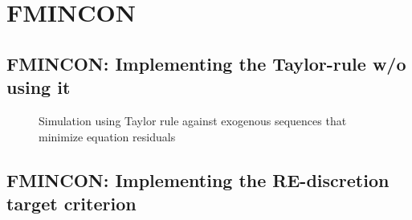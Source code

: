 \documentclass[11pt]{article}
\def \myFigPath {../figures/}
\renewcommand{\[}{\begin{equation}}
\renewcommand{\]}{\end{equation}}
\def\myAdjustableFigScale{0.16}
\begin{document}
\section{FMINCON}
\subsection{FMINCON: Implementing the Taylor-rule w/o using it}

\vspace{-0.2cm}

\begin{figure}[h!]
\hfill
{}
\caption{Simulation using Taylor rule against exogenous sequences that minimize equation residuals}
\end{figure}


\newpage
\subsection{FMINCON: Implementing the RE-discretion target criterion}

\vspace{-0.2cm}
\end{document}
